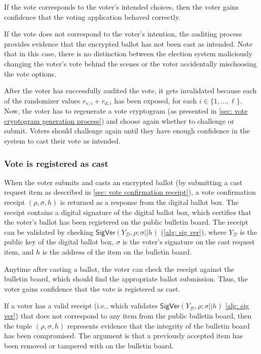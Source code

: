 If the vote corresponds to the voter's intended choices, then the voter gains confidence that the voting application behaved correctly.

If the vote does not correspond to the voter's intention, the auditing process provides evidence that the encrypted ballot has not been cast as intended. Note that in this case, there is no distinction between the election system maliciously changing the voter's vote behind the scenes or the voter accidentally mischoosing the vote options.

After the voter has successfully audited the vote, it gets invalidated because each of the randomizer values $r_{\mathrm{v}; i} + r_{\mathrm{d}; i}$ has been exposed, for each $i \in \{ 1, ..., \ell \}$. Now, the voter has to regenerate a vote cryptogram (as presented in \cref{sec: vote cryptogram generation process}) and choose again whether to challenge or submit. Voters should challenge again until they have enough confidence in the system to cast their vote as intended.

 
\subsubsection{Vote is registered as cast} \label{sec: vote is registered as cast}
When the voter submits and casts an encrypted ballot (by submitting a cast request item as described in \cref{sec: vote confirmation receipt}), a vote confirmation receipt $(\rho, \sigma, h)$ is returned as a response from the digital ballot box. The receipt contains a digital signature of the digital ballot box, which certifies that the voter's ballot has been registered on the public bulletin board. The receipt can be validated by checking $\mathsf{SigVer} (Y_\mathcal{D}, \rho; \sigma || h)$ (\cref{alg: sig ver}), where $Y_\mathcal{D}$ is the public key of the digital ballot box, $\sigma$ is the voter's signature on the cast request item, and $h$ is the address of the item on the bulletin board.

Anytime after casting a ballot, the voter can check the receipt against the bulletin board, which should find the appropriate ballot submission. Thus, the voter gains confidence that the vote is registered as cast.

If a voter has a valid receipt (i.e., which validates $\mathsf{SigVer} (Y_\mathcal{D}, \rho; \sigma || h)$ \cref{alg: sig ver}) that does not correspond to any item from the public bulletin board, then the tuple $(\rho, \sigma, h)$ represents evidence that the integrity of the bulletin board has been compromised. The argument is that a previously accepted item has been removed or tampered with on the bulletin board.
